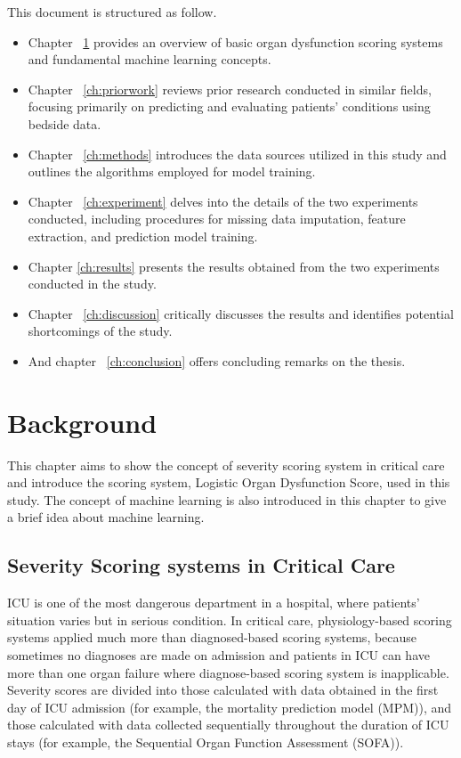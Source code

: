 \documentclass[12pt,a4paper,english
]{tunithesis}
\begin{document}
This document is structured as follow. 
\begin{itemize}
\item Chapter ~\ref{ch:background} provides an overview of basic organ dysfunction scoring systems and fundamental machine learning concepts.
\item Chapter ~\ref{ch:priorwork} reviews prior research conducted in similar fields, focusing primarily on predicting and evaluating patients' conditions using bedside data. 
\item Chapter ~\ref{ch:methods} introduces the data sources utilized in this study and outlines the algorithms employed for model training. 
\item Chapter ~\ref{ch:experiment} delves into the details of the two experiments conducted, including procedures for missing data imputation, feature extraction, and prediction model training.
\item Chapter \ref{ch:results} presents the results obtained from the two experiments conducted in the study.
\item Chapter ~\ref{ch:discussion} critically discusses the results and identifies potential shortcomings of the study.
\item And chapter ~\ref{ch:conclusion} offers concluding remarks on the thesis.
\end{itemize}


\chapter{Background}
\label{ch:background}
This chapter aims to show the concept of severity scoring system in critical care and introduce the scoring system, Logistic Organ Dysfunction Score, used in this study. The concept of machine learning is also introduced in this chapter to give a brief idea about machine learning.

\section{Severity Scoring systems in Critical Care}
ICU is one of the most dangerous department in a hospital, where patients' situation varies but in serious condition. In critical care, physiology-based scoring systems applied much more than diagnosed-based scoring systems, because sometimes no diagnoses are made on admission and patients in ICU can have more than one organ failure where diagnose-based scoring system is inapplicable. \parencite{Bouch2008} Severity scores are divided into those calculated with data obtained in the first day of ICU admission (for example, the mortality prediction model (MPM)), and those calculated with data collected sequentially throughout the duration of ICU stays (for example, the Sequential Organ Function Assessment (SOFA)). 
\end{document}
